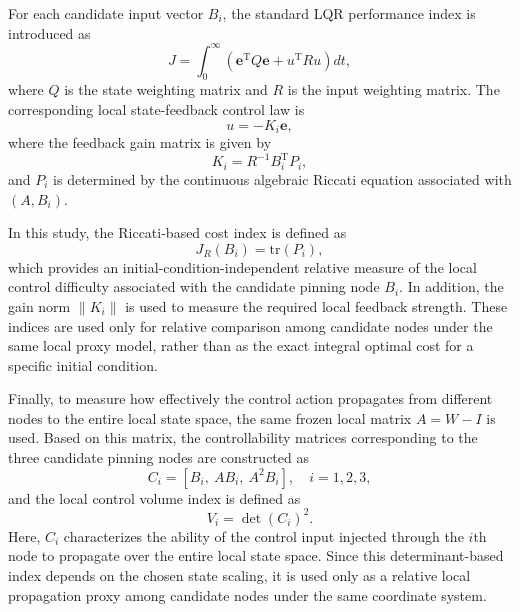 \documentclass[10pt,twocolumn]{article}
\theoremstyle{definition}
\begin{document}
For each candidate input vector $B_i$, the standard LQR performance index is introduced as
\begin{equation}
	J
	=
	\int_{0}^{\infty}
	\left(
	\mathbf{e}^{\mathrm T}Q\mathbf{e}
	+
	u^{\mathrm T}Ru
	\right)dt,
	\label{eq:lqr_cost}
\end{equation}
where $Q$ is the state weighting matrix and $R$ is the input weighting matrix. The corresponding local state-feedback control law is
\begin{equation}
	u=-K_i\mathbf{e},
	\label{eq:lqr_control}
\end{equation}
where the feedback gain matrix is given by
\begin{equation}
	K_i=R^{-1}B_i^{\mathrm T}P_i,
	\label{eq:lqr_gain}
\end{equation}
and $P_i$ is determined by the continuous algebraic Riccati equation associated with $(A,B_i)$.

In this study, the Riccati-based cost index is defined as
\begin{equation}
	J_R(B_i)=\mathrm{tr}(P_i),
	\label{eq:riccati_cost_index}
\end{equation}
which provides an initial-condition-independent relative measure of the local control difficulty associated with the candidate pinning node $B_i$. In addition, the gain norm $\|K_i\|$ is used to measure the required local feedback strength. These indices are used only for relative comparison among candidate nodes under the same local proxy model, rather than as the exact integral optimal cost for a specific initial condition.

Finally, to measure how effectively the control action propagates from different nodes to the entire local state space, the same frozen local matrix $A=W-I$ is used. Based on this matrix, the controllability matrices corresponding to the three candidate pinning nodes are constructed as~\cite{kailath1980linear}
\begin{equation}
	C_i=
	\left[
	B_i,\ AB_i,\ A^2B_i
	\right],
	\quad i=1,2,3,
	\label{eq:controllability_matrices}
\end{equation}
and the local control volume index is defined as
\begin{equation}
	V_i=\det(C_i)^2.
	\label{eq:control_volume}
\end{equation}
Here, $C_i$ characterizes the ability of the control input injected through the $i$th node to propagate over the entire local state space. Since this determinant-based index depends on the chosen state scaling, it is used only as a relative local propagation proxy among candidate nodes under the same coordinate system.
\end{document}
